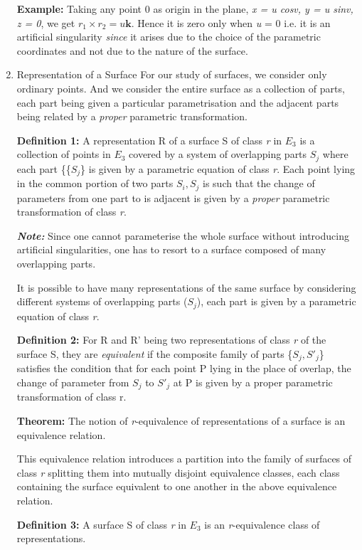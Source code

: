 \documentclass[11pt]{article}
\begin{document}
\begin{enumerate}
\textbf{Example:} Taking any point 0 as origin in the plane, \emph{x = u cosv, y = u sinv, z = 0}, we get \(r_{1} \times r_{2} = u\textbf{k}\). Hence it is zero only when \emph{u} = 0 i.e. it is an artificial singularity \emph{since} it arises due to the choice of the parametric coordinates and not due to the nature of the surface.
\item Representation of a Surface
\label{sec:orged47883}
For our study of surfaces, we consider only ordinary points. And we consider the entire surface as a collection of parts, each part being given a particular parametrisation and the adjacent parts being related by a \emph{proper} parametric transformation.

\textbf{Definition 1:} A representation R of a surface S of class \emph{r} in \(E_{3}\) is a collection of points in \(E_{3}\) covered by a system of overlapping parts \({S_{j}}\) where each part \{\{\(S_{j}\)\} is given by a parametric equation of class \emph{r}. Each point lying in the common portion of two parts \(S_{i}, S_{j}\) is such that the change of parameters from one part to is adjacent is given by a \emph{proper} parametric transformation of class \emph{r}.

\textbf{\emph{Note:}} Since one cannot parameterise the whole surface without introducing artificial singularities, one has to resort to a surface composed of many overlapping parts.

It is possible to have many representations of the same surface by considering different systems of overlapping parts (\(S_{j}\)), each part is given by a parametric equation of class \emph{r}.

\textbf{Definition 2:} For R and R' being two representations of class \emph{r} of the surface S, they are \emph{equivalent} if the composite family of parts \{\(S_{j},S'_{j}\)\} satisfies the condition that for each point P lying in the place of overlap, the change of parameter from \(S_{j}\)  to \(S'_{j}\) at P is given by a proper parametric transformation of class r.

\textbf{Theorem:} The notion of \emph{r}-equivalence of representations of a surface is an equivalence relation.

This equivalence relation introduces a partition into the family of surfaces of class \emph{r} splitting them into mutually disjoint equivalence classes, each class containing the surface equivalent to one another in the above equivalence relation.

\textbf{Definition 3:} A surface S of class \emph{r} in \(E_{3}\) is an \emph{r}-equivalence class of representations.


\end{enumerate}
\end{document}
